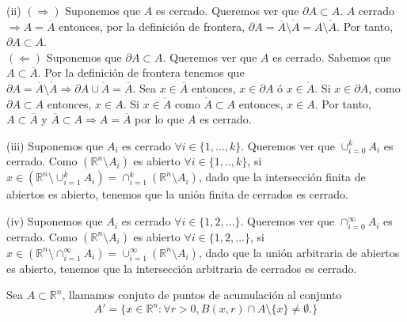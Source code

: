 \begin{dem}(ii)
    $(\Rightarrow)$ Suponemos que $A$ es cerrado. Queremos ver que $\partial{A} \subset A$. $A$ cerrado $\Rightarrow A = \overline{A}$ entonces, por la definición de frontera, $\partial{A} = \overline{A}\setminus\mathring{A} = A\setminus\mathring{A}$.  Por tanto, $\partial{A}\subset A$.\\
    
    $(\Leftarrow)$ Suponemos que $\partial{A}\subset A$. Queremos ver que $A$ es cerrado. Sabemos que $A \subset \overline{A}$. Por la definición de frontera tenemos que \\$\partial{A} =  \overline{A}\setminus\mathring{A} \Rightarrow \partial{A} \cup \mathring{A} = \overline{A}$. Sea $x\in\overline{A}$ entonces, $x\in\partial{A}$ ó $x\in\mathring{A}$. Si $x\in \partial{A}$, como $\partial{A}\subset A$ entonces, $x\in A$. Si $x\in\mathring{A}$ como $\mathring{A}\subset A$ entonces, $x\in A$. Por tanto, $A \subset \overline{A}$ y $\overline{A} \subset A \Rightarrow A = \overline{A}$ por lo que $A$ es cerrado.
\end{dem}
 
\begin{dem}(iii)
    Suponemos que $A_i$ es cerrado $\forall i \in \{1,...,k\}$. Queremos ver que $\cup_{i=0}^k A_i$ es cerrado. Como $(\mathbb{R}^n \setminus A_i)$ es abierto $\forall i\in\{1,..,k\}$, si $x\in (\mathbb{R}^n \setminus \cup_{i=1}^k A_i) = \cap_{i=1}^k ( \mathbb{R}^n \setminus A_i) $, dado que la intersección finita de abiertos es abierto, tenemos que la unión finita de cerrados es cerrado.  
\end{dem}

\begin{dem}(iv)
    Suponemos que $A_i$ es cerrado $\forall i\in\{1,2,...\}$. Queremos ver que  $\cap_{i=0}^{\infty} A_i$ es cerrado. Como $(\mathbb{R}^n \setminus A_i)$ es abierto $\forall i\in\{1,2,...\}$, si $x\in (\mathbb{R}^n \setminus \cap_{i=1}^{\infty} A_i) = \cup_{i=1}^{\infty} ( \mathbb{R}^n \setminus A_i)$, dado que la unión arbitraria de abiertos es abierto, tenemos que la intersección arbitraria de cerrados es cerrado.
\end{dem}


\begin{defn}
Sea $A \subset \mathbb{R}^n$, llamamos conjuto de puntos de acumulación al conjunto \[ A' = \{ x\in \mathbb{R}^n : \forall r > 0, B(x,r)\cap A \setminus \{x\} \neq \emptyset. \} \]
\end{defn}

